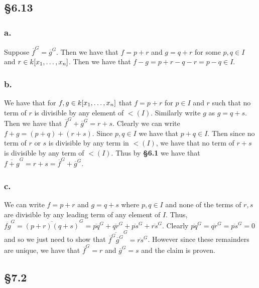 \documentclass[letterpaper]{article}
\begin{document}
\subsection*{\S 6.13}

\subsubsection*{a.}

Suppose $\overline{f}^{G} = \overline{g}^{G}$.
Then we have that $f = p + r$ and $g = q + r$ for some $p, q \in I$ and $r \in k\bqty{x_{1}, \ldots, x_{n}}$.
Then we have that $f - g = p + r - q - r = p - q \in I$.

\subsubsection*{b.}

We have that for $f, g \in k\bqty{x_{1}, \ldots, x_{n}}$ that $f = p + r$ for $p \in I$ and $r$ such that no term of $r$ is divisible by any element of $\lt(I)$.
Similarly write $g$ as $g = q + s$.
Then we have that $\overline{f}^{G} + \overline{g}^{G} = r + s$.
Clearly we can write $f + g = (p + q) + (r + s)$.
Since $p, q \in I$ we have that $p + q \in I$.
Then since no term of $r$ or $s$ is divisible by any term in $\lt(I)$, we have that no term of $r + s$ is divisible by any term of $\lt(I)$.
Thus by \textbf{\S 6.1} we have that $\overline{f + g}^{G} = r + s = \overline{f}^{G} + \overline{g}^{G}$.

\subsubsection*{c.}

We can write $f = p + r$ and $g = q + s$ where $p, q \in I$ and none of the terms of $r, s$ are divisible by any leading term of any element of $I$.
Thus, $\overline{fg}^G = \overline{(p + r)(q + s)}^G = \overline{pq}^G + \overline{qr}^G + \overline{ps}^G + \overline{rs}^G$.
Clearly $\overline{pq}^G = \overline{qr}^G = \overline{ps}^G = 0$ and so we just need to show that $ \overline{\overline{f}^G \overline{g}^G}^G = \overline{rs}^G$.
However since these remainders are unique, we have that $\overline{f}^{G} = r$ and $\overline{g}^{G} = s$ and the claim is proven.

\subsection*{\S 7.2}
\end{document}
